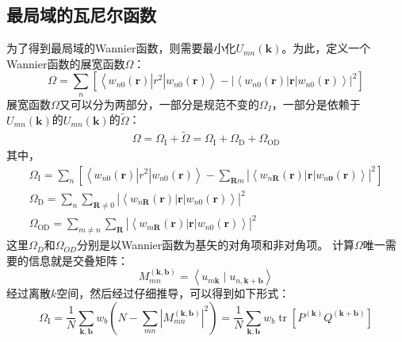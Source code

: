 \subsection{最局域的瓦尼尔函数}
为了得到最局域的Wannier函数，则需要最小化$U_{m n}(\mathbf{k})$。为此，定义一个Wannier函数的展宽函数$\Omega$：
\begin{equation}
    \label{eq:2-21}
    \Omega=\sum_{n}\left[\left\langle w_{n 0}(\mathbf{r})\left|r^{2}\right| w_{n 0}(\mathbf{r})\right\rangle-\left|\left\langle w_{n 0}(\mathbf{r})|\mathbf{r}| w_{n 0}(\mathbf{r})\right\rangle\right|^{2}\right]
\end{equation}
展宽函数$\Omega$又可以分为两部分，一部分是规范不变的$\Omega_I$，一部分是依赖于$U_{m n}(\mathbf{k})$的$U_{m n}(\mathbf{k})$的$\tilde{\Omega}$：
\begin{equation}
    \label{eq:2-22}
    \begin{array}{c}
    \Omega=\Omega_{\mathrm{I}}+\tilde{\Omega}=\Omega_{\mathrm{I}}+\Omega_{\mathrm{D}}+\Omega_{\mathrm{OD}} 
    \end{array}
\end{equation}
其中，
\begin{equation}
    \label{eq:2-23}
    \begin{array}{c}
    \Omega_{\mathrm{I}}=\sum\limits_{n}\left[\left\langle w_{n 0}(\mathbf{r})\left|r^{2}\right| w_{n 0}(\mathbf{r})\right\rangle-\sum\limits_{\mathbf{R} m}\left|\left\langle w_{n \mathbf{R}}(\mathbf{r})|\mathbf{r}| w_{n \mathbf{0}}(\mathbf{r})\right\rangle\right|^{2}\right] \\
    \Omega_{\mathrm{D}}=\sum\limits_{n} \sum\limits_{\mathbf{R} \neq 0}\left|\left\langle w_{n \mathbf{R}}(\mathbf{r})|\mathbf{r}| w_{n 0}(\mathbf{r})\right\rangle\right|^{2} \\
    \Omega_{\mathrm{OD}}=\sum\limits_{m \neq n} \sum\limits_{\mathbf{R}}\left|\left\langle w_{m \mathbf{R}}(\mathbf{r})|\mathbf{r}| w_{n 0}(\mathbf{r})\right\rangle\right|^{2}
    \end{array}
\end{equation}
这里$\Omega_D$和$\Omega_{OD}$分别是以Wannier函数为基矢的对角项和非对角项。
计算$\Omega$唯一需要的信息就是交叠矩阵：
\begin{equation}
    \label{eq:2-24}
    M_{m n}^{(\mathbf{k}, \mathbf{b})}=\left\langle u_{m \mathbf{k}} \mid u_{n, \mathbf{k}+\mathbf{b}}\right\rangle
\end{equation}
经过离散$k$空间，然后经过仔细推导\citep{wf1}，可以得到如下形式：
\begin{equation}
    \label{eq:2-25}
    \Omega_{\mathrm{I}} =\frac{1}{N} \sum_{\mathbf{k}, \mathbf{b}} w_{b}\left(N-\sum_{m n}\left|M_{m n}^{(\mathbf{k}, \mathbf{b})}\right|^{2}\right)=\frac{1}{N} \sum_{\mathbf{k}, \mathbf{b}} w_{b} \operatorname{tr}\left[P^{(\mathbf{k})} Q^{(\mathbf{k}+\mathbf{b})}\right]
\end{equation}
